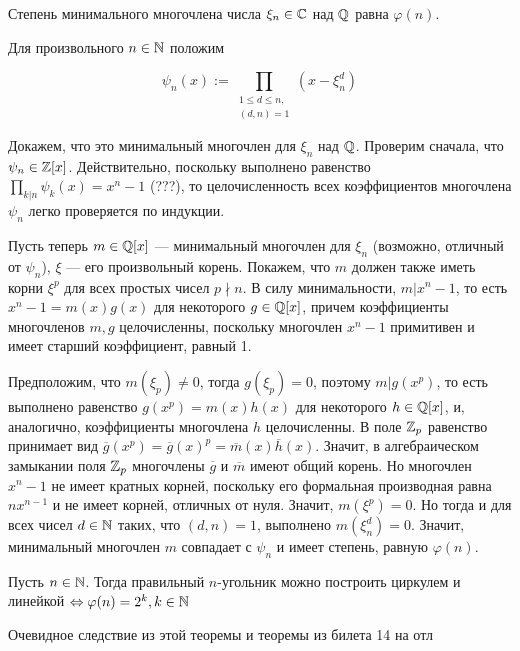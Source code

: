 \par \Th Степень минимального многочлена числа $\xi_n \in \mathbb{C}$ над $\mathbb{Q}$ равна $\varphi(n)$.

\par \Proof Для произвольного $n \in \mathbb{N}$ положим 

$$\psi_n(x):=\prod_{\substack{1\leq d \leq n, \\ (d,n)=1}} (x-\xi_n^d)$$

\par Докажем, что это минимальный многочлен для $\xi_n$ над $\mathbb{Q}$. Проверим сначала, что $\psi_n \in \mathbb{Z}[x]$.
Действительно, поскольку выполнено равенство $\prod_{k|n} \psi_k(x)=x^n-1$ (???), то целочисленность всех коэффициентов многочлена $\psi_n$ легко проверяется по индукции.

\par Пусть теперь $m \in \mathbb{Q}[x]$ — минимальный многочлен для $\xi_n$ (возможно, отличный от $\psi_n$), $\xi$ — его произвольный корень. Покажем, что $m$ должен также иметь корни $\xi^p$ для всех
простых чисел $p \nmid n$. В силу минимальности, $m | x^n-1$, то есть $x^n-1=m(x)g(x)$ для некоторого $g \in \mathbb{Q}[x]$, причем коэффициенты многочленов $m,g$ целочисленны, поскольку многочлен $x^n-1$ примитивен и имеет старший коэффициент, равный 1. 

\par Предположим, что $m(\xi_p)\neq 0$, тогда $g(\xi_p)=0$, поэтому $m | g(x^p)$, то есть выполнено равенство $g(x^p)=m(x)h(x)$ для некоторого $h \in \mathbb{Q}[x]$, и, аналогично, коэффициенты многочлена $h$ целочисленны. В поле $\mathbb{Z}_p$ равенство принимает вид $\overline{g}(x^p)=\overline{g}(x)^p=\overline{m}(x)\overline{h}(x)$. Значит, в алгебраическом замыкании поля $\mathbb{Z}_p$ многочлены $\overline{g}$ и $\overline{m}$ имеют общий корень. Но многочлен $x^n-1$ не имеет кратных корней, поскольку его формальная производная равна $nx^{n-1}$ и не имеет корней, отличных от нуля. Значит, $m(\xi^p)=0$. Но тогда и для всех чисел $d \in \mathbb{N}$ таких, что $(d,n)=1$, выполнено $m(\xi_n^d)=0$. Значит, минимальный многочлен $m$ совпадает с $\psi_n$ и имеет степень, равную $\varphi(n)$. \EndProof

\par \Cor Пусть $n \in \mathbb{N}$. Тогда правильный $n$-угольник можно построить циркулем и линейкой $\Leftrightarrow \varphi(n)=2^k, k\in \mathbb{N}$
\par \Proof Очевидное следствие из этой теоремы и теоремы из билета 14 на отл \EndProof